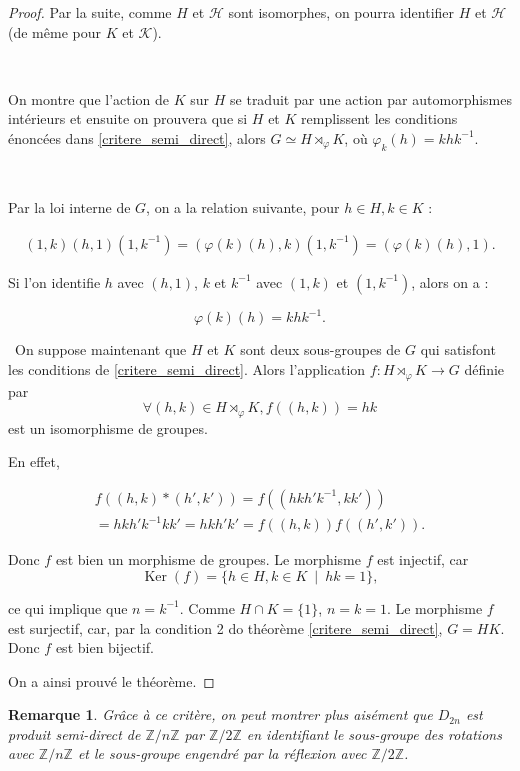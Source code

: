 \documentclass[french]{report}
\newtheorem*{remark}{Remarque}
\begin{document}
\begin{proof}
Par la suite, comme $H$ et $\mathcal{H}$ sont isomorphes, on pourra identifier $H$ et $\mathcal{H}$ (de même pour $K$ et $\mathcal{K}$).

\

On montre  que l'action de $K$ sur $H$ se traduit par une action par automorphismes intérieurs et ensuite on prouvera que si $H$ et $K$ remplissent les conditions énoncées dans \ref{critere_semi_direct}, alors $G \simeq H \rtimes _{\varphi} K$, où $\varphi_k(h) = k h k ^{-1} $.

\

Par la loi interne de $G$, on a la relation suivante, pour $h \in H, k \in K$ :

\begin{gather*}
  (1, k)(h,1)(1, k ^{-1} ) = (\varphi(k)(h),k)(1, k ^{-1} ) = (\varphi(k)(h), 1).
\end{gather*}

Si l'on identifie $h$ avec $(h,1)$, $k$ et $k ^{-1} $ avec $(1,k)$ et $(1, k ^{-1} )$, alors on a :

$$\varphi(k)(h) = k h k ^{-1} .$$


\
On suppose maintenant que $H$ et $K$ sont deux sous-groupes de $G$ qui satisfont les conditions de \ref{critere_semi_direct}. Alors l'application $  f : H \rtimes _{\varphi} K \to G$ définie par $$ \forall (h,k) \in H \rtimes _{\varphi} K, f ((h,k)) = hk$$ est un isomorphisme de groupes.

En effet,

\begin{gather*}
  f((h,k)*(h',k')) = f( (h k h' k ^{-1} ,kk') ) \\
  = h k h' k ^{-1} k k' = hkh' k' = f((h,k)) f((h',k')).
\end{gather*}

Donc $f$ est bien un morphisme de groupes. Le morphisme $f$ est injectif, car $$ \operatorname{Ker}(f) = \{ h \in H, k \in K \ \mid \ hk=1 \},$$

ce qui implique que $n = k ^{-1}$. Comme $H \cap K = \{ 1 \} $, $n = k  =1$. Le morphisme $f$ est surjectif, car, par la condition 2 do théorème \ref{critere_semi_direct}, $G = HK$. Donc $f$ est bien bijectif.

On a ainsi prouvé le théorème.
\end{proof}

\begin{remark}
  Grâce à ce critère, on peut montrer plus aisément que $D _{2n}$ est produit semi-direct de $\mathbb{Z}/{ n }\mathbb{Z}$ par $\mathbb{Z}/{ 2 }\mathbb{Z}$ en identifiant le sous-groupe des rotations avec $\mathbb{Z}/{ n }\mathbb{Z}$ et le sous-groupe engendré par la réflexion avec $\mathbb{Z}/{ 2 }\mathbb{Z}$.
\end{remark}
\end{document}
